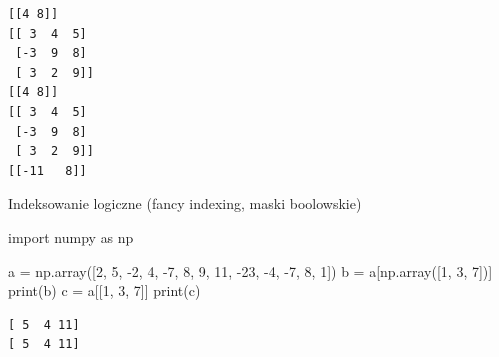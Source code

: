 \documentclass[
  polish,
  letterpaper,
  DIV=11,
  numbers=noendperiod]{scrreprt}
\newenvironment{Shaded}{\begin{snugshade}}{\end{snugshade}}
\newcommand{\BuiltInTok}[1]{\textcolor[rgb]{0.00,0.23,0.31}{#1}}
\newcommand{\DecValTok}[1]{\textcolor[rgb]{0.68,0.00,0.00}{#1}}
\newcommand{\ImportTok}[1]{\textcolor[rgb]{0.00,0.46,0.62}{#1}}
\newcommand{\NormalTok}[1]{\textcolor[rgb]{0.00,0.23,0.31}{#1}}
\newcommand{\OperatorTok}[1]{\textcolor[rgb]{0.37,0.37,0.37}{#1}}
\begin{document}
\begin{verbatim}
[[4 8]]
[[ 3  4  5]
 [-3  9  8]
 [ 3  2  9]]
[[4 8]]
[[ 3  4  5]
 [-3  9  8]
 [ 3  2  9]]
[[-11   8]]
\end{verbatim}

Indeksowanie logiczne (fancy indexing, maski boolowskie)

\begin{Shaded}
\begin{Highlighting}[]
\ImportTok{import}\NormalTok{ numpy }\ImportTok{as}\NormalTok{ np}

\NormalTok{a }\OperatorTok{=}\NormalTok{ np.array([}\DecValTok{2}\NormalTok{, }\DecValTok{5}\NormalTok{, }\OperatorTok{{-}}\DecValTok{2}\NormalTok{, }\DecValTok{4}\NormalTok{, }\OperatorTok{{-}}\DecValTok{7}\NormalTok{, }\DecValTok{8}\NormalTok{, }\DecValTok{9}\NormalTok{, }\DecValTok{11}\NormalTok{, }\OperatorTok{{-}}\DecValTok{23}\NormalTok{, }\OperatorTok{{-}}\DecValTok{4}\NormalTok{, }\OperatorTok{{-}}\DecValTok{7}\NormalTok{, }\DecValTok{8}\NormalTok{, }\DecValTok{1}\NormalTok{])}
\NormalTok{b }\OperatorTok{=}\NormalTok{ a[np.array([}\DecValTok{1}\NormalTok{, }\DecValTok{3}\NormalTok{, }\DecValTok{7}\NormalTok{])]}
\BuiltInTok{print}\NormalTok{(b)}
\NormalTok{c }\OperatorTok{=}\NormalTok{ a[[}\DecValTok{1}\NormalTok{, }\DecValTok{3}\NormalTok{, }\DecValTok{7}\NormalTok{]]}
\BuiltInTok{print}\NormalTok{(c)}
\end{Highlighting}
\end{Shaded}

\begin{verbatim}
[ 5  4 11]
[ 5  4 11]
\end{verbatim}
\end{document}
